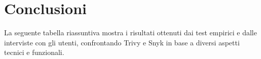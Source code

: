 \chapter{Conclusioni}
La seguente tabella riassuntiva mostra i risultati ottenuti dai test empirici e dalle interviste con gli utenti, confrontando Trivy e Snyk in base a diversi aspetti tecnici e funzionali.
